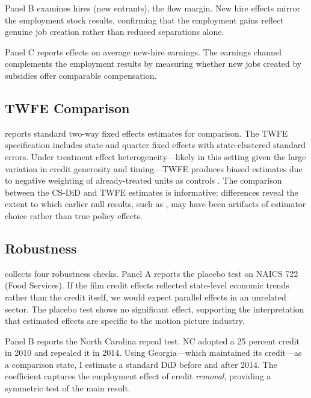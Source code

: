 \documentclass[12pt]{article}
\begin{document}
Panel B examines hires (new entrants), the flow margin. New hire effects mirror the employment stock results, confirming that the employment gains reflect genuine job creation rather than reduced separations alone.

Panel C reports effects on average new-hire earnings. The earnings channel complements the employment results by measuring whether new jobs created by subsidies offer comparable compensation.



\subsection{TWFE Comparison}

 reports standard two-way fixed effects estimates for comparison. The TWFE specification includes state and quarter fixed effects with state-clustered standard errors. Under treatment effect heterogeneity---likely in this setting given the large variation in credit generosity and timing---TWFE produces biased estimates due to negative weighting of already-treated units as controls \citep{deChaisemartin2020, GoodmanBacon2021}. The comparison between the CS-DiD and TWFE estimates is informative: differences reveal the extent to which earlier null results, such as \citet{Button2019}, may have been artifacts of estimator choice rather than true policy effects.



\subsection{Robustness}

 collects four robustness checks. Panel A reports the placebo test on NAICS 722 (Food Services). If the film credit effects reflected state-level economic trends rather than the credit itself, we would expect parallel effects in an unrelated sector. The placebo test shows no significant effect, supporting the interpretation that estimated effects are specific to the motion picture industry.

Panel B reports the North Carolina repeal test. NC adopted a 25 percent credit in 2010 and repealed it in 2014. Using Georgia---which maintained its credit---as a comparison state, I estimate a standard DiD before and after 2014. The coefficient captures the employment effect of credit \textit{removal}, providing a symmetric test of the main result.
\end{document}

